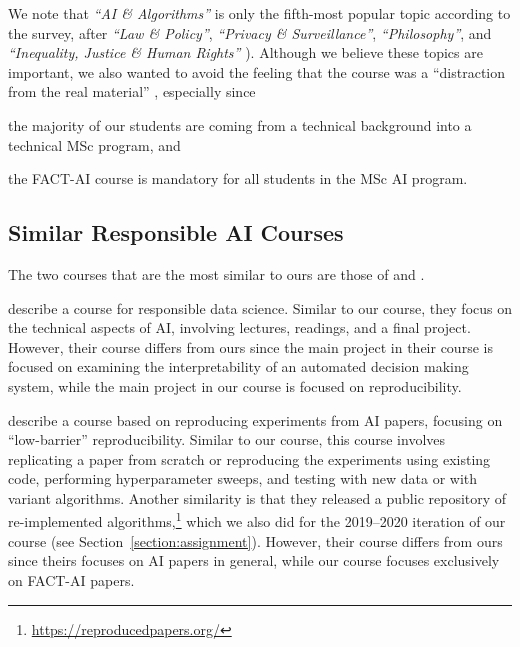 We note that \textit{``AI \& Algorithms''} is only the fifth-most popular topic according to the survey, after \textit{``Law \& Policy''}, \textit{``Privacy \& Surveillance''}, \textit{``Philosophy''}, and \textit{``Inequality, Justice \& Human Rights''} \citep[see Table 2,][]{fiesler2020we}). 
Although we believe these topics are important, we also wanted to avoid the feeling that the course was a ``distraction from the real material'' \citep{lewis2021teaching}, especially since 
\begin{enumerate*}[label=(\roman*)]
\item the majority of our students are coming from a technical background into a technical MSc program, and 
\item the FACT-AI course is mandatory for all students in the MSc AI program. 
\end{enumerate*}

\subsection{Similar Responsible AI Courses}
The two courses that are the most similar to ours are those of \citet{lewis2021teaching} and \citet{yildiz2021reproducedpapers}. 

\citet{lewis2021teaching} describe a course for responsible data science. 
Similar to our course, they focus on the technical aspects of AI, involving lectures, readings, and a final project. 
However, their course differs from ours since the main project in their course is focused on examining the interpretability of an automated decision making system, while the main project in our course is focused on reproducibility. 

\citet{yildiz2021reproducedpapers} describe a course based on reproducing experiments from AI papers, focusing on ``low-barrier'' reproducibility. 
Similar to our course, this course involves replicating a paper from scratch or reproducing the experiments using existing code, performing hyperparameter sweeps, and testing with new data or with variant algorithms. 
Another similarity is that they released a public repository of re-implemented algorithms,\footnote{\url{https://reproducedpapers.org/}} which we also did for the 2019--2020 iteration of our course (see Section~\ref{section:assignment}). 
However, their course differs from ours since theirs focuses on AI papers in general, while our course focuses exclusively on FACT-AI papers. 

